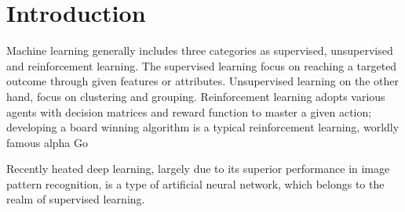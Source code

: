 \section{Introduction}

Machine learning generally includes three categories as supervised, unsupervised and reinforcement learning. The supervised learning focus on reaching a targeted outcome through given features or attributes. Unsupervised learning on the other hand, focus on clustering and grouping. Reinforcement learning adopts various agents with decision matrices and reward function to master a given action; developing a board winning algorithm is a typical reinforcement learning, worldly famous alpha Go
\par
Recently heated deep learning, largely due to its superior performance in image pattern recognition, is a type of artificial neural network, which belongs to the realm of supervised learning. 

